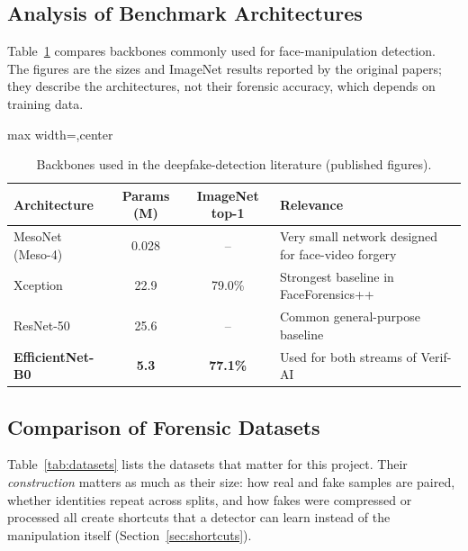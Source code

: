 \subsection{Analysis of Benchmark Architectures}
Table~\ref{tab:backbones} compares backbones commonly used for face-manipulation detection. The figures are the sizes and ImageNet
results reported by the original papers; they describe the architectures, not their forensic accuracy, which depends on training data.

\begin{table}[ht]
\centering
\caption{Backbones used in the deepfake-detection literature (published figures).}
\label{tab:backbones}
\small
\begin{adjustbox}{max width=\linewidth,center}
\begin{tabular}{|l|c|c|p{5.2cm}|}
\hline
\textbf{Architecture} & \textbf{Params (M)} & \textbf{ImageNet top-1} & \textbf{Relevance} \\ \hline
MesoNet (Meso-4) \citep{afchar2018mesonet} & 0.028 & -- & Very small network designed for face-video forgery \\ \hline
Xception \citep{chollet2017xception} & 22.9 & 79.0\% & Strongest baseline in FaceForensics++ \citep{rossler2019ff} \\ \hline
ResNet-50 \citep{he2016resnet} & 25.6 & -- & Common general-purpose baseline \\ \hline
\textbf{EfficientNet-B0} \citep{tan2019efficientnet} & \textbf{5.3} & \textbf{77.1\%} & Used for both streams of Verif-AI \\ \hline
\end{tabular}
\end{adjustbox}
\end{table}

\subsection{Comparison of Forensic Datasets}
Table~\ref{tab:datasets} lists the datasets that matter for this project. Their \emph{construction} matters as much as their size: how real and
fake samples are paired, whether identities repeat across splits, and how fakes were compressed or processed all create shortcuts that a
detector can learn instead of the manipulation itself (Section~\ref{sec:shortcuts}).

